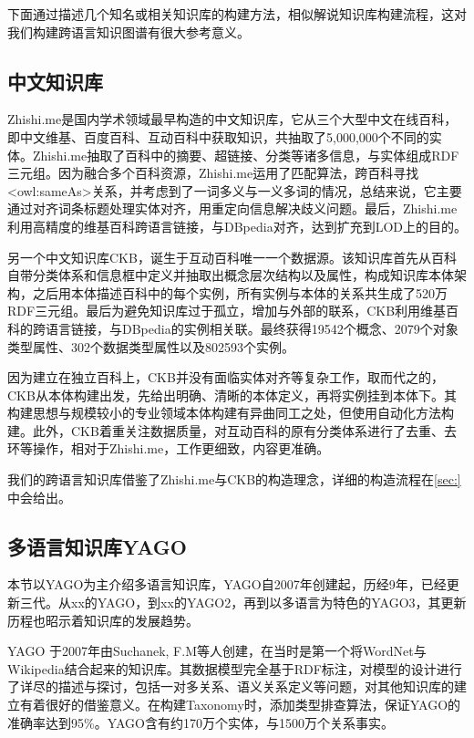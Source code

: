 下面通过描述几个知名或相关知识库的构建方法，相似解说知识库构建流程，这对我们构建跨语言知识图谱有很大参考意义。

\subsection{中文知识库}

Zhishi.me\cite{niu2011zhishi,wang2014publishing}是国内学术领域最早构造的中文知识库，它从三个大型中文在线百科，即中文维基、百度百科、互动百科中获取知识，共抽取了5,000,000个不同的实体。Zhishi.me抽取了百科中的摘要、超链接、分类等诸多信息，与实体组成RDF三元组。因为融合多个百科资源，Zhishi.me运用了匹配算法，跨百科寻找<owl:sameAs>关系，并考虑到了一词多义与一义多词的情况，总结来说，它主要通过对齐词条标题处理实体对齐，用重定向信息解决歧义问题。最后，Zhishi.me利用高精度的维基百科跨语言链接，与DBpedia对齐，达到扩充到LOD上的目的。

另一个中文知识库CKB\cite{wang2011building}，诞生于互动百科唯一一个数据源。该知识库首先从百科自带分类体系和信息框中定义并抽取出概念层次结构以及属性，构成知识库本体架构，之后用本体描述百科中的每个实例，所有实例与本体的关系共生成了520万RDF三元组。最后为避免知识库过于孤立，增加与外部的联系，CKB利用维基百科的跨语言链接，与DBpedia的实例相关联。最终获得19542个概念、2079个对象类型属性、302个数据类型属性以及802593个实例。

因为建立在独立百科上，CKB并没有面临实体对齐等复杂工作，取而代之的，CKB从本体构建出发，先给出明确、清晰的本体定义，再将实例挂到本体下。其构建思想与规模较小的专业领域本体构建有异曲同工之处，但使用自动化方法构建。此外，CKB着重关注数据质量，对互动百科的原有分类体系进行了去重、去环等操作，相对于Zhishi.me，工作更细致，内容更准确。

我们的跨语言知识库借鉴了Zhishi.me与CKB的构造理念，详细的构造流程在\ref{sec:}中会给出。

\subsection{多语言知识库YAGO}
本节以YAGO为主介绍多语言知识库，YAGO自2007年创建起，历经9年，已经更新三代。从xx的YAGO\cite{suchanek2007yago,suchanek2008yago}，到xx的YAGO2\cite{hoffart2013yago2}，再到以多语言为特色的YAGO3\cite{mahdisoltani2014yago3}，其更新历程也昭示着知识库的发展趋势。

{\heiti YAGO} 于2007年由Suchanek, F.M等人创建，在当时是第一个将WordNet\cite{fellbaum1998wordnet}与Wikipedia结合起来的知识库。其数据模型完全基于RDF标注，对模型的设计进行了详尽的描述与探讨，包括一对多关系、语义关系定义等问题，对其他知识库的建立有着很好的借鉴意义。在构建Taxonomy时，添加类型排查算法，保证YAGO的准确率达到95\%。YAGO含有约170万个实体，与1500万个关系事实。


